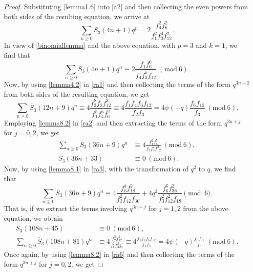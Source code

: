 \documentclass[12pt]{amsart}
\theoremstyle{plain}
\theoremstyle{definition}
\begin{document}
\begin{proof} Substituting \eqref{lemma1.6} into \eqref{a2} and then collecting the even powers from both sides of the resulting equation, we arrive at
\[
\sum_{n \geq 0} \overline{S}_{3}(4n+1) q^{n} = 2 \frac{f_{4}^{2} f_{6}^{2}}{f_{1}^{2} f_{3}^{4} f_{12}^{2}}.
\]
In view of \eqref{binomiallemma} and the above equation, with $p=3$ and $k=1$, we find that
\begin{equation}
\sum_{n \geq 0} \overline{S}_{3}(4n+1) q^{n} \equiv 2 \frac{f_{1} f_{6}^{6}}{f_{4} f_{3}^{5} f_{12}} \ (\mathrm{mod} \ 6).\label{ra1}
\end{equation}
Now, by using \eqref{lemma4.2} in \eqref{ra1} and then collecting the terms of the form $q^{3n+2}$ from both sides of the resulting equation, we get
\begin{equation}
\sum_{n \geq 0} \overline{S}_{3}(12n+9) q^{n} \equiv 4 \frac{f_{2}^{8} f_{3} f_{12}^{3}}{f_{1}^{5} f_{4}^{5} f_{6}^{2}} \equiv 4 \frac{f_{1} f_{4} f_{6} f_{12}}{f_{2} f_{3}}= 4 \psi(-q) \frac{f_{6} f_{12}}{f_{3}} \ (\mathrm{mod} \ 6).\label{ra2}
\end{equation}
Employing \eqref{lemma8.2} in \eqref{ra2} and then extracting the terms of the form $q^{3n+j}$ for $j=0,2$, we get
\begin{align}
\sum_{n \geq 0} \overline{S}_{3}(36n+9) q^{n} &\equiv 4\frac{f_{4}^{2} f_{6}^{5}}{f_{2} f_{3}^{2} f_{12}^{2}} \ (\mathrm{mod} \ 6), \label{ra3}\\
\overline{S}_{3}(36n+33)  &\equiv 0  \ (\mathrm{mod} \ 6). \label{ra4}
\end{align}
Now, by using \eqref{lemma8.1} in \eqref{ra3}, with the transformation of $q^2$ to $q$, we find that
\[
\sum_{n \geq 0} \overline{S}_{3}(36n+9) q^{n} \equiv 4 \frac{f_{6}^{4} f_{18}^{2}}{f_{3}^{2} f_{12} f_{36}} + 4q^{2} \frac{f_{6}^{5} f_{36}^{2}}{f_{3}^{2} f_{12}^{2} f_{18}} \pmod 6.
\]
That is, if we extract the terms involving $q^{3n+j}$ for $j=1,2$ from the above equation, we obtain 
\begin{align}
\overline{S}_{3}(108n+45) &\equiv 0 \ (\mathrm{mod} \ 6), \label{ra5}\\
\sum_{n \geq 0} \overline{S}_{3}(108n+81) q^{n} &\equiv 4 \frac{f_{2}^{5} f_{12}^{2}}{f_{1}^{2} f_{4}^{2} f_{6}} \equiv 4  \frac{f_{1} f_{2} f_{6} f_{12}}{f_{2} f_{3}} = 4 \psi(-q) \frac{f_{6} f_{12}}{f_{3}} \ (\mathrm{mod} \ 6). \label{ra6}
\end{align}
Once again, by using \eqref{lemma8.2} in \eqref{ra6} and then collecting the terms of the form $q^{3n+j}$ for $j=0,2$, we get

\end{proof}
\end{document}
